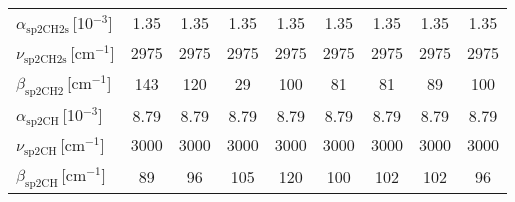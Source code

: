 \begin{tabular}{lcccccccc}
$\alpha_\mathrm{sp2CH2s}$\,[10$^{-3}$] & 1.35 & 1.35 & 1.35 & 1.35 & 1.35 & 1.35 & 1.35 & 1.35\\
$\nu_\mathrm{sp2CH2s}$\,[cm$^{-1}$] & 2975 & 2975 & 2975 & 2975 & 2975 & 2975 & 2975 & 2975\\
$\beta_\mathrm{sp2CH2}$\,[cm$^{-1}$] & 143 & 120 & 29 & 100 & 81 & 81 & 89 & 100\\
$\alpha_\mathrm{sp2CH}$\,[10$^{-3}$] & 8.79 & 8.79 & 8.79 & 8.79 & 8.79 & 8.79 & 8.79 & 8.79\\
$\nu_\mathrm{sp2CH}$\,[cm$^{-1}$] & 3000 & 3000 & 3000 & 3000 & 3000 & 3000 & 3000 & 3000\\
$\beta_\mathrm{sp2CH}$\,[cm$^{-1}$] & 89 & 96 & 105 & 120 & 100 & 102 & 102 & 96\\
\hline
\end{tabular}
